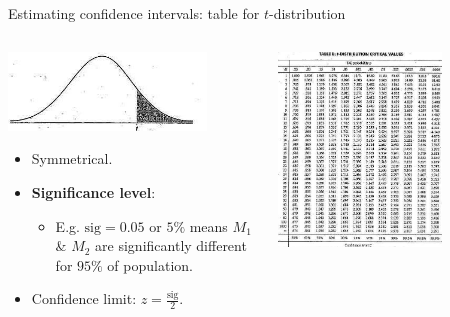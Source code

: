 \documentclass[aspectratio=169,t,table]{beamer}
\begin{document}
  {
    \begin{frame}{Estimating confidence intervals: table for $t$-distribution}
      \begin{columns}
        \begin{column}{0.5\textwidth}
          \vspace{-6cm}

          \centering
          \includegraphics[width=0.8\textwidth]{img/ttest1.jpeg}
          \begin{itemize}
            \item Symmetrical.
            \item \textbf{\color{airforceblue}Significance level}:
            \begin{itemize}
              \item E.g. $\text{sig} = 0.05$ or $5\%$ means $M_1$ \& $M_2$ are significantly different for $95\%$ of population.
            \end{itemize}
            \item Confidence limit: $z = \frac{\text{sig}}{2}$.
          \end{itemize}
        \end{column}
        \begin{column}{0.5\textwidth}
          \centering
          \includegraphics[width=0.7\textwidth]{img/ttest2.jpeg}
        \end{column}
      \end{columns}
    \end{frame}
  }
\end{document}
